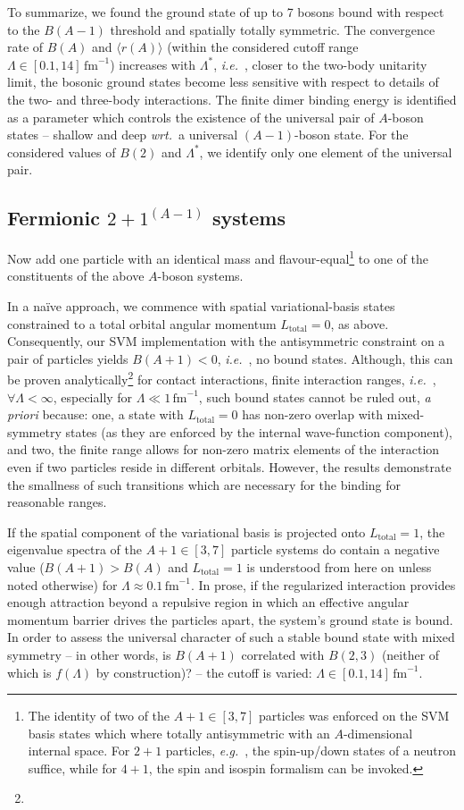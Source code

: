 \documentclass[preprint,12pt]{elsarticle}
\newcommand{\fm}{\ensuremath{\,\text{fm}^{-1}}}
\newcommand{\abb}{\ensuremath{2\!+\!1^{(A-1)}}}
\newcommand{\wrt}{\textit{wrt.}~}
\newcommand{\eg}{\textit{e.g.}~}
\newcommand{\ie}{\textit{i.e.}~}
\newcommand{\rms}[1]{\ensuremath{\langle r(#1)\rangle}}
\begin{document}
To summarize, we found the ground state of up to 7 bosons bound with respect to the
$B(A-1)$ threshold and spatially totally symmetric.
The convergence rate of $B(A)$ and $\rms{A}$ (within the considered cutoff range
$\Lambda\in[0.1,14]\fm$) increases with $\Lambda^*$, \ie, closer to the 
two-body unitarity limit, the bosonic
ground states become less sensitive with respect to details of the two- and three-body 
interactions. The finite dimer binding energy is identified as a parameter which
controls the existence of the universal pair of $A$-boson states -- shallow and deep
\wrt a universal $(A-1)$-boson state. For the considered values of $B(2)$ and
$\Lambda^*$, we identify only one element of the universal pair.

\subsection{Fermionic $\abb$ systems}
Now add one particle with an identical mass and
flavour-equal\footnote{
The identity of two of the $A+1\in[3,7]$ particles was enforced on the SVM basis
states which where totally
antisymmetric with an $A$-dimensional internal space. For $2+1$ particles, \eg, the 
spin-up/down states of a neutron suffice,
while for $4+1$, the spin and isospin formalism can be invoked.}
to one of the constituents of the above $A$-boson systems.

In a na\"ive approach, we
commence with spatial variational-basis states constrained to
a total orbital angular momentum $L_\text{total}=0$, as above.
Consequently, our SVM implementation with the antisymmetric constraint
on a pair of particles yields $B(A+1)<0$, \ie, no bound states.
Although, this can be proven analytically\footnote{} for contact interactions,
finite interaction ranges, \ie, $\forall\Lambda<\infty$, especially for
$\Lambda\ll 1\fm$, such bound states cannot be ruled out, {\it a priori}
because: one, a state with $L_\text{total}=0$ has non-zero overlap with 
mixed-symmetry states (as they are enforced by the internal wave-function component), 
and two, the finite range allows for 
non-zero matrix elements of the interaction even if two particles reside 
in different orbitals.
However, the results demonstrate the smallness of such transitions
which are necessary for the binding for reasonable ranges.

If the spatial component of the variational basis is projected
onto $L_\text{total}=1$, the eigenvalue spectra of
the $A+1\in[3,7]$ particle systems do contain a negative value ($B(A+1)>B(A)$ and
$L_\text{total}=1$ is understood from here on unless noted otherwise)
for $\Lambda\approx0.1\fm$.
In prose, if the regularized interaction provides enough attraction beyond
a repulsive region in which an effective
angular momentum barrier drives the particles apart,
the system's ground state is bound.
In order to assess the universal character of such a stable bound state
with mixed symmetry -- in other words, is $B(A+1)$ correlated
with $B(2,3)$ (neither of which is $f(\Lambda)$ by construction)? --
the cutoff is varied: $\Lambda\in[0.1,14]\fm$.
\end{document}
